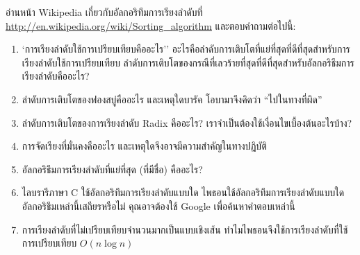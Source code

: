 \begin{exercise}


อ่านหน้า Wikipedia เกี่ยวกับอัลกอริทึมการเรียงลำดับที่ \url{http://en.wikipedia.org/wiki/Sorting_algorithm} 
และตอบคำถามต่อไปนี้:

\begin{enumerate}

  
\item `การเรียงลำดับใช้การเปรียบเทียบคืออะไร'' อะไรคือลำดับการเติบโตที่แย่ที่สุดที่ดีที่สุดสำหรับการเรียงลำดับใช้การเปรียบเทียบ 
ลำดับการเติบโตของกรณีที่เลวร้ายที่สุดที่ดีที่สุดสำหรับอัลกอริธึมการเรียงลำดับคืออะไร?

\item ลำดับการเติบโตของฟองสบู่คืออะไร และเหตุใดบารัค โอบามาจึงคิดว่า ``ไปในทางที่ผิด''

\item ลำดับการเติบโตของการเรียงลำดับ Radix คืออะไร? เราจำเป็นต้องใช้เงื่อนไขเบื้องต้นอะไรบ้าง?

\item การจัดเรียงที่มั่นคงคืออะไร และเหตุใดจึงอาจมีความสำคัญในทางปฏิบัติ

\item อัลกอริธึมการเรียงลำดับที่แย่ที่สุด (ที่มีชื่อ) คืออะไร?

\item ไลบรารีภาษา C ใช้อัลกอริทึมการเรียงลำดับแบบใด ไพธอนใช้อัลกอริทึมการเรียงลำดับแบบใด อัลกอริธึมเหล่านี้เสถียรหรือไม่ คุณอาจต้องใช้ Google เพื่อค้นหาคำตอบเหล่านี้

\item การเรียงลำดับที่ไม่เปรียบเทียบจำนวนมากเป็นแบบเชิงเส้น ทำไมไพธอนจึงใช้การเรียงลำดับที่ใช้การเปรียบเทียบ $O(n \log n)$

\end{enumerate}

\end{exercise}


